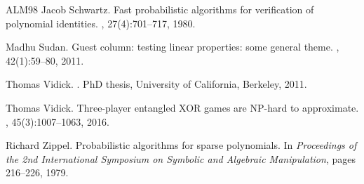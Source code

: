 \documentclass[11pt]{article}
\theoremstyle{definition}
\begin{document}
\begin{thebibliography}{ALM{\etalchar{+}}98}
Jacob Schwartz.
\newblock Fast probabilistic algorithms for verification of polynomial
  identities.
, 27(4):701--717, 1980.

Madhu Sudan.
\newblock Guest column: testing linear properties: some general theme.
, 42(1):59--80, 2011.

Thomas Vidick.
.
\newblock PhD thesis, University of California, Berkeley, 2011.

Thomas Vidick.
\newblock Three-player entangled {XOR} games are {NP}-hard to approximate.
, 45(3):1007--1063, 2016.

Richard Zippel.
\newblock Probabilistic algorithms for sparse polynomials.
\newblock In {\em Proceedings of the 2nd International Symposium on Symbolic
  and Algebraic Manipulation}, pages 216--226, 1979.

\end{thebibliography}
\end{document}
